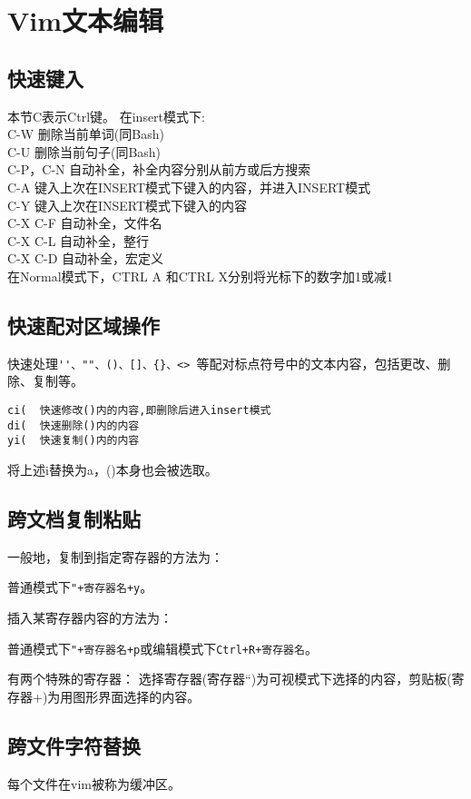 \section{Vim文本编辑}


\subsection{快速键入}
本节C表示Ctrl键。
在insert模式下:\\
C-W 删除当前单词(同Bash) \\
C-U 删除当前句子(同Bash)\\
C-P，C-N  自动补全，补全内容分别从前方或后方搜索\\
C-A 键入上次在INSERT模式下键入的内容，并进入INSERT模式\\
C-Y 键入上次在INSERT模式下键入的内容\\
C-X C-F 自动补全，文件名\\
C-X C-L 自动补全，整行\\
C-X C-D  自动补全，宏定义\\

在Normal模式下，CTRL A 和CTRL X分别将光标下的数字加1或减1

\subsection{快速配对区域操作}
快速处理\verb+''、""、()、[]、{}、<> +等配对标点符号中的文本内容，包括更改、删除、复制等。
\begin{verbatim}
ci(  快速修改()内的内容,即删除后进入insert模式
di(  快速删除()内的内容
yi(  快速复制()内的内容
\end{verbatim}
将上述i替换为a，()本身也会被选取。


\subsection{跨文档复制粘贴}
一般地，复制到指定寄存器的方法为：

普通模式下\verb|"+寄存器名+y|。

插入某寄存器内容的方法为：

普通模式下\verb|"+寄存器名+p|或编辑模式下\verb|Ctrl+R+寄存器名|。

有两个特殊的寄存器： 选择寄存器(寄存器``)为可视模式下选择的内容，剪贴板(寄存器+)为用图形界面选择的内容。


\subsection{跨文件字符替换}
每个文件在vim被称为缓冲区。

